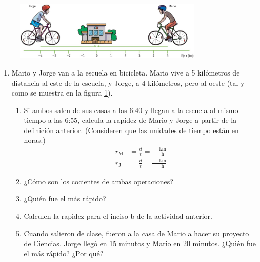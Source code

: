 \documentclass[11pt]{book}
\begin{document}
\begin{figure}[H]
  \centering
  \includegraphics[width=0.8\textwidth]{mario_jorge.jpg}
  \label{fig:mario_jorge}
\end{figure}
\begin{enumerate}

  \item Mario y Jorge van a la escuela en bicicleta. Mario vive a 5 kilómetros de distancia al este
        de la escuela, y Jorge, a 4 kilómetros, pero al oeste (tal y como se muestra en la
        figura \ref{fig:mario_jorge}).
        \begin{enumerate}
          \item Si ambos salen de sus casas a las 6:40
                y llegan a la escuela al mismo tiempo a las 6:55, calcula la rapidez de
                Mario y Jorge a partir de la definición anterior.
                (Consideren que las unidades de tiempo están en horas.)
                \begin{align*}
                  r_{\text{M}} & =\frac{d}{t}=\frac{\quad \text{ km}}{\quad \text{ h}} \\
                  r_{\text{J}} & =\frac{d}{t}=\frac{\quad \text{ km}}{\quad \text{ h}}
                \end{align*}

          \item ¿Cómo son los cocientes de ambas operaciones?
          \item ¿Quién fue el más rápido?
          \item Calculen la rapidez para el inciso b de la actividad anterior.
          \item Cuando salieron de clase, fueron a la casa de Mario a hacer su proyecto
                de Ciencias. Jorge llegó en 15 minutos y Mario en 20 minutos.
                ¿Quién fue el más rápido? ¿Por qué?
        \end{enumerate}


\end{enumerate}
\end{document}
